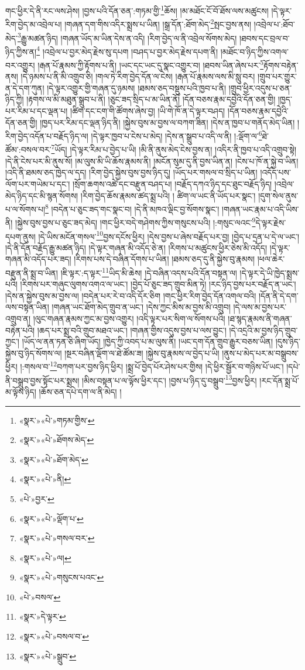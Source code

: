 གང་ཕྱིར་དེ་ནི་རང་ལས་ཤེས། །བྱས་པའི་དོན་ཅན་:གཏམ་གྱི་\footnote{«སྣར་»«པེ་»གཏམ་གྱིས་}ཆོས། །མ་མཐོང་ངོ་བོ་ཐོས་ལས་མཚུངས། །དེ་ལྟར་རིག་བྱེད་མ་འབྲེལ་པ། །གཞན་དག་གིས་འདིར་སྨྲས་པ་ཡིན། །སྒྲ་དོན་:ཐོག་མེད་\footnote{«སྣར་»«པེ་»ཐོགས་མེད་}སྤང་བྱས་ནས། །འབྲེལ་པ་:ཐོབ་མེད་\footnote{«སྣར་»«པེ་»ཐོག་མེད་}རྒྱུ་མཚན་ཉིད། །གཞན་ཡོད་མ་ཡིན་དེས་ན་འདི། །རིག་བྱེད་ལ་ནི་འབྲེལ་སོགས་མེད། །ཐབས་དང་བྲལ་བ་ཉིད་ཀྱིས་ན།\footnote{«སྣར་»«པེ་»ནི།} །འབྲེལ་པ་བྱར་མེད་རྗེས་སུ་དཔག །བཤད་པ་བྱར་མེད་རྗེས་དཔག་ནི། །མཐོང་བ་ཉིད་ཀྱིས་འགལ་བར་འགྱུར། །རྒན་པོ་རྣམས་ཀྱི་རྟོགས་པ་ནི། །ཡང་དང་ཡང་དུ་སྣང་འགྱུར་བ། །ཐབས་ཡིན་ཞེས་པར་\footnote{«པེ་»བྱར་}རྟོགས་བརྟེན་ནས། །དེ་ཉམས་པ་ནི་མི་འགྲུབ་ཅི། །གལ་ཏེ་རིག་བྱེད་དོན་ལ་ངེས། །རྒན་པོ་རྣམས་ལས་མི་སླུ་བར། །གྲུབ་པར་གྱུར་ན་དེ་དག་ཀུན། །དེ་ལྟར་འགྱུར་གྱི་གཞན་དུ་ཉམས། །ཐམས་ཅད་བསྡུས་པའི་ཁྱབ་པ་ནི། །གྲུབ་ཕྱིར་འདུས་པ་ཅན་ཉིད་ཀྱི། །རྟགས་ལ་མི་མཐུན་སྒྲུབ་པ་ནི། །ཅུང་ཟད་སྲིད་པ་མ་ཡིན་ནོ། །དོན་བཅས་རྣམ་དབྱེའི་དོན་ཅན་གྱི། །ཁྱད་པར་རིམ་པ་དང་ལྡན་པ། །ཚིག་དང་ངག་གི་ཚོགས་ཞེས་བྱ། །ཡི་གེ་ཁོ་ན་དེ་ལྟར་བཤད། །དོན་བཅས་རྣམ་དབྱེའི་དོན་ཅན་གྱི། །ཁྱད་པར་རིམ་དང་ལྡན་ཉིད་ནི། །སྐྱེས་བུས་མ་བྱས་ལ་བཀག་ཟིན། །དེས་ན་ཁྱབ་པ་གནོད་མེད་ཡིན། །རིག་བྱེད་འདོན་པ་བརྗོད་ཉིད་ལ། །དེ་ལྟར་ཁྱབ་པ་ངེས་པ་མེད། །དེས་ན་སྒྲུབ་པ་འདི་ལ་ནི། །:ལྡོག་ལ་\footnote{«སྣར་»«པེ་»ལྡོག་པ་}ཐེ་ཚོམ་:བསལ་བར་\footnote{«སྣར་»«པེ་»གསལ་བར་}ཡོད། །དེ་ལྟར་རིམ་པ་བྱེད་པ་ཡི། །མི་ནི་ནུས་མེད་ངེས་བྱས་ན། །འདིར་ནི་ཁྱབ་པ་འདི་འགྲུབ་སྟེ། །དེ་ནི་ངེས་པར་མི་ནུས་སོ། །མ་ལུས་མི་ཡི་ཆོས་རྣམས་ནི། །མངོན་སུམ་དུ་ནི་བྱས་ཡིན་ན། །ངེས་པ་ཁོ་ན་སྐྱེ་བ་ཡིན། །འདི་ནི་ཐམས་ཅད་ཁྱེད་ལ་དད། །རིག་བྱེད་སྐྱེས་བུས་བྱས་ཉིད་དུ། །ཡོད་པར་གསལ་བ་སྲིད་པ་ཡིན། །འདོད་པས་ལོག་པར་གཡེམ་པ་དང་། །སྲོག་ཆགས་འཚེ་དང་བརྫུན་བཤད་པ། །བརྗོད་དཀའ་ཉིད་དང་ཐུང་བརྗོད་ཉིད། །འབྲེལ་མེད་ཉིད་དང་མི་སྙན་སོགས། །རིག་བྱེད་ཆོས་རྣམས་ཚད་སྨྲ་པའི། །
ཚིག་ལ་ཡང་ནི་ཡོད་པར་སྣང་། །དུག་སེལ་ནུས་པ་ལ་སོགས་པ།\footnote{«སྣར་»«པེ་»ལ།} །བདེན་པ་ཅུང་ཟད་གང་སྣང་བ། །དེ་ནི་མཁའ་ལྡིང་བྱ་སོགས་སྣང་། །གཞན་ཡང་རྣམ་པ་འདི་ཡིས་ནི། །སྐྱེས་བུས་བྱས་པ་ཅུང་ཟད་མེད། །གང་ཕྱིར་བདེ་གཤེགས་ཀྱིས་གསུངས་པའི། །:གསུང་ལའང་\footnote{«སྣར་»«པེ་»གསུངས་པའང་}དེ་ལྟར་རྗེས་དཔག་ནུས། །དེ་ཡིས་མངོན་གསལ་\footnote{«པེ་»བསལ་}བྱས་དངོས་ཕྱིར། །དེས་བྱས་པ་ཞེས་བརྗོད་པར་བྱ། །བྱེད་པ་དྲན་པ་དེ་ལ་ཡང་། །དེ་ནི་དོན་བརྗོད་རྒྱུ་མཚན་ཉིད། །དེ་ལྟར་གཞན་མི་འདོད་ཅེ་ན། །རིགས་པ་མཚུངས་ཕྱིར་ཅེས་མི་འདོད། །དེ་ལྟར་གཞན་མི་འདོད་པར་ཟད། །རིགས་པས་དེ་བཞིན་དོགས་པ་ཡིན། །ཐམས་ཅད་དུ་ནི་སྐྱེས་བུ་རྣམས། །ཕལ་ཆེར་བརྫུན་ནི་སྨྲ་བ་ཡིན། །ཇི་ལྟར་:ད་ལྟར་\footnote{«སྣར་»དེ་ལྟར་}ཡིད་མི་ཆེས། །དེ་བཞིན་འདས་པའི་དོན་བསྟན་ལ། །དེ་ལྟར་དེ་ཡི་ཁྱེད་སྨྲས་པའི། །རིགས་པར་གཞུང་ལུགས་འགའ་ལ་ཡང་། །བྱེད་པོ་ཅུང་ཟད་གྲུབ་མིན་ཏེ། །རང་ཉིད་བྱས་པར་བརྗོད་ན་ཡང་། །དེས་ན་སྐྱེས་བུས་མ་བྱས་ལ། །བདེན་པར་རེ་བ་འདི་དོར་ཅིག །གང་ཕྱིར་རིག་བྱེད་དོན་འགལ་བའི། །དོན་ནི་དེ་དག་ལས་བསྟན་ཡིན། །གཞན་ཡང་ཐོག་མེད་གྲུབ་ན་ཡང་། །དེས་ཀྱང་མིས་མ་བྱས་མི་འགྲུབ། །དེ་ལས་མ་བྱས་པར་འགྲུབ་ན། །ལུང་གཞན་རྣམས་ཀྱང་མ་བྱས་འགྱུར། །འདི་ལྟར་པར་སིག་ལ་སོགས་པའི། །ཐ་སྙད་རྣམས་ནི་གཞན་བརྟེན་པའི། །ཆད་པར་སྨྲ་བའི་གྲུབ་མཐའ་ཡང་། །གཞན་གྱིས་འདུས་བྱས་པ་ལས་བྱུང་། །དེ་འདྲའི་མ་བྱས་ཉིད་གྲུབ་ཀྱང་། །ཡོད་ལ་ནན་ཏན་ཅི་ཞིག་ཡོད། །ཁྱེད་ཀྱི་འབད་པ་མ་ལུས་ནི། །ཡང་དག་དོན་གྲུབ་རྒྱུར་བཅས་ཡིན། །དུས་ཉིད་སྐྱེས་བུ་ཉིད་སོགས་ལ། །སྔར་བཞིན་ལྡོག་ལ་ཐེ་ཚོམ་ཟ། །སྐྱེས་བུ་རྣམས་ལ་བྱེད་པ་ཡི། །ནུས་པ་མེད་པར་མ་བསྒྲུབས་ཕྱིར། །:གསལ་བ་\footnote{«སྣར་»«པེ་»བསལ་བ་}བཀག་པར་བྱས་ཉིད་ཕྱིར། །སྨྲ་པོ་བྱེད་པོར་ཤེས་པར་གྱིས། །དེ་ཕྱིར་སྦྱོར་བ་གཉིས་པོ་ཡང་། །དཔེ་ནི་བསྒྲུབ་བྱས་སྟོང་པར་སྨྲས། །མིས་བསྟན་པ་ལ་ལྟོས་ཕྱིར་དང་། །བྱས་པ་ཉིད་དུ་བསྒྲུབ་\footnote{«སྣར་»«པེ་»སྒྲུབ་}བྱས་ཕྱིར། །རང་དོན་སྨྲ་པོ་མ་ལྟོས་ཉིད། །ཆོས་ཅན་དཔེ་དག་ལ་ནི་མེད། །

